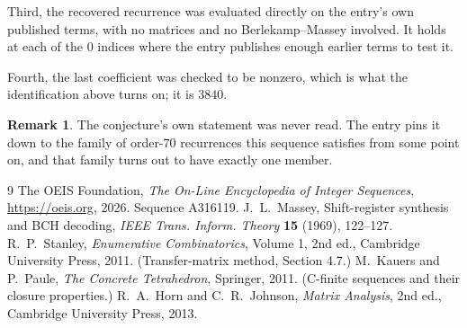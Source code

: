 \documentclass[11pt,a4paper]{article}
\theoremstyle{plain}
\theoremstyle{definition}
\newtheorem{remark}[theorem]{Remark}
\begin{document}
Third, the recovered recurrence was evaluated directly on the entry's own published terms, with
no matrices and no Berlekamp--Massey involved. It holds at each of the $0$ indices where
the entry publishes enough earlier terms to test it.

Fourth, the last coefficient was checked to be nonzero, which is what the identification above
turns on; it is $3840$.

\begin{remark}
The conjecture's own statement was never read. The entry pins it down to the family of
order-$70$ recurrences this sequence satisfies from some point on, and that family turns
out to have exactly one member.
\end{remark}

\begin{thebibliography}{9}
 The OEIS Foundation, \emph{The On-Line Encyclopedia of Integer
Sequences}, \url{https://oeis.org}, 2026. Sequence A316119.
 J.~L.~Massey, Shift-register synthesis and BCH decoding, \emph{IEEE
Trans. Inform. Theory} \textbf{15} (1969), 122--127.
 R.~P.~Stanley, \emph{Enumerative Combinatorics}, Volume 1, 2nd ed.,
Cambridge University Press, 2011. (Transfer-matrix method, Section 4.7.)
 M.~Kauers and P.~Paule, \emph{The Concrete Tetrahedron}, Springer, 2011.
(C-finite sequences and their closure properties.)
 R.~A.~Horn and C.~R.~Johnson, \emph{Matrix Analysis}, 2nd ed., Cambridge
University Press, 2013.
\end{thebibliography}
\end{document}
